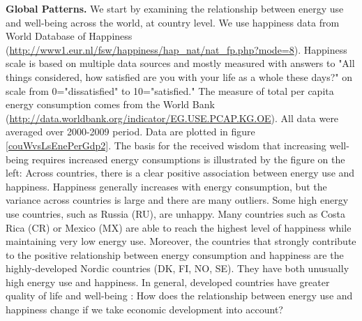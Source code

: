 \documentclass[10pt, letterpaper]{article}
\begin{document}
\begin{spacing}{1.0}
\textbf{Global Patterns.} We start by examining the relationship between energy
use and well-being across the world, at country level.  %
We use happiness data from World Database of Happiness
(\url{http://www1.eur.nl/fsw/happiness/hap_nat/nat_fp.php?mode=8}). 
  Happiness scale is based on multiple data sources and mostly measured with answers to
"All things considered, how satisfied are you with your life as a whole these
days?" on scale from 0="dissatisfied" to 10="satisfied." 
The measure of total per capita energy consumption comes from the World Bank
(\url{http://data.worldbank.org/indicator/EG.USE.PCAP.KG.OE}). All data were
averaged over 2000-2009 period. Data are plotted in figure \ref{couWvsLsEnePerGdp2}.
% 
%
 The basis for the received wisdom that increasing well-being requires increased
energy consumptions is illustrated by the figure on the left: Across countries,
there is a clear positive association between energy use and
happiness. Happiness generally increases with energy consumption, but the variance across
countries is large and there are many outliers. Some high energy use countries, such as
Russia (RU),  are unhappy. Many countries such as Costa
Rica (CR) or  Mexico (MX) are able to reach the highest level of happiness while maintaining very low energy use. 
%
%
%
Moreover, the  countries that strongly contribute to the positive
relationship between energy consumption and happiness are the highly-developed
Nordic countries (DK, FI, NO, SE). They have both unusually high energy use and
happiness. In general, developed countries have greater quality of life and
well-being \citep{mazur11, jorgenson14C}: How does the relationship between
energy use and happiness change if we take economic development into account?
%


\end{spacing}
\end{document}
